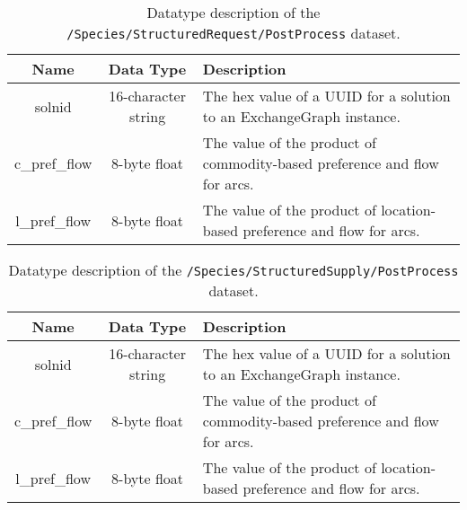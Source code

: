 \begin{table}[h!]
\centering
\label{tbl:/Species/StructuredRequest/PostProcess}
\caption{Datatype description of the \lstinline[basicstyle=\ttfamily\color{black}]|/Species/StructuredRequest/PostProcess| dataset.}
\begin{tabularx}{\columnwidth-10pt}{|c|c|X|} %
\hline
\textbf{Name} & \textbf{Data Type} & \textbf{Description}       \\ \hline
solnid & 16-character string & The hex value of a UUID for a solution to an ExchangeGraph instance. \\ \hline
c\_pref\_flow & 8-byte float & The value of the product of commodity-based preference and flow for arcs. \\ \hline
l\_pref\_flow & 8-byte float & The value of the product of location-based preference and flow for arcs. \\ \hline
\end{tabularx}
\end{table}

\begin{table}[h!]
\centering
\label{tbl:/Species/StructuredSupply/PostProcess}
\caption{Datatype description of the \lstinline[basicstyle=\ttfamily\color{black}]|/Species/StructuredSupply/PostProcess| dataset.}
\begin{tabularx}{\columnwidth-10pt}{|c|c|X|} %
\hline
\textbf{Name} & \textbf{Data Type} & \textbf{Description}       \\ \hline
solnid & 16-character string & The hex value of a UUID for a solution to an ExchangeGraph instance. \\ \hline
c\_pref\_flow & 8-byte float & The value of the product of commodity-based preference and flow for arcs. \\ \hline
l\_pref\_flow & 8-byte float & The value of the product of location-based preference and flow for arcs. \\ \hline
\end{tabularx}
\end{table}


